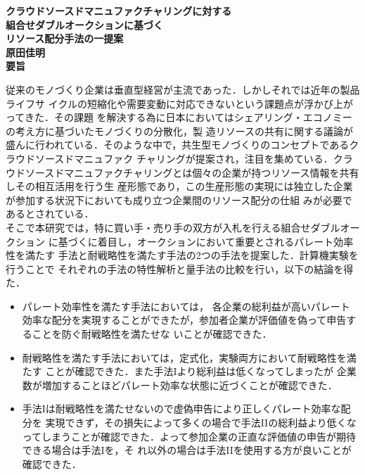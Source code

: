 \newpage
\thispagestyle{empty}
\begin{center}
	\mbox{\LARGE{\bf{クラウドソースドマニュファクチャリングに対する}}} \\
	\mbox{\LARGE{\bf{組合せダブルオークションに基づく}}} \\
	\mbox{\LARGE{\bf{リソース配分手法の一提案}}} \\
	\vspace*{2mm}
	\mbox{\Large{\bf{原田佳明}}}\\
	\vspace*{7mm}
	{\LARGE\bf 要旨}
\end{center}\par
従来のモノづくり企業は垂直型経営が主流であった．しかしそれでは近年の製品ライフサ
イクルの短縮化や需要変動に対応できないという課題点が浮かび上がってきた．その課題
を解決する為に日本においてはシェアリング・エコノミーの考え方に基づいたモノづくりの分散化，製
造リソースの共有に関する議論が盛んに行われている．そのような中で，共生型モノづくりのコンセプトであるクラウドソースドマニュファク
チャリングが提案され，注目を集めている．クラウドソースドマニュファクチャリングとは個々の企業が持つリソース情報を共有しその相互活用を行う生
産形態であり，この生産形態の実現には独立した企業が参加する状況下においても成り立つ企業間のリソース配分の仕組
みが必要であるとされている．\\
そこで本研究では，特に買い手・売り手の双方が入札を行える組合せダブルオークション
に基づくに着目し，オークションにおいて重要とされるパレート効率性を満たす
手法と耐戦略性を満たす手法の2つの手法を提案した．計算機実験を行うことで
それぞれの手法の特性解析と量手法の比較を行い，以下の結論を得た．
\begin{itemize}
\item パレート効率性を満たす手法においては， 各企業の総利益が高いパレート
  効率な配分を実現することができたが，参加者企業が評価値を偽って申告することを防ぐ耐戦略性を満たせな
  いことが確認できた．
\item 耐戦略性を満たす手法においては，定式化，実験両方において耐戦略性を満たす
ことが確認できた．また手法Iより総利益は低くなってしまったが
企業数が増加することほどパレート効率な状態に近づくことが確認できた．
\item 手法Iは耐戦略性を満たせないので虚偽申告により正しくパレート効率な配分を
  実現できず，その損失によって多くの場合で手法IIの総利益より低くなってしまうことが確認できた．よって参加企業の正直な評価値の申告が期待できる場合は手法Iを，そ
  れ以外の場合は手法IIを使用する方が良いことが確認できた．
\end{itemize}